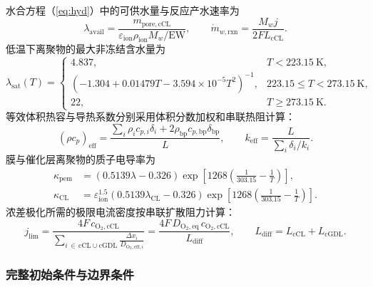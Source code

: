 \documentclass{gmcmthesis}
\begin{document}
水合方程（\ref{eq:hyd}）中的可供水量与反应产水速率为
\begin{equation}
  \lambda_{\mathrm{avail}}
  =\frac{m_{\mathrm{pore,cCL}}}{\varepsilon_{\mathrm{ion}}\rho_{\mathrm{ion}}M_w/\mathrm{EW}},
  \qquad
  \dot m_{w,\mathrm{rxn}}=\frac{M_wj}{2FL_{\mathrm{cCL}}}.
  \label{eq:hydclosure}
\end{equation}
低温下离聚物的最大非冻结含水量为
\begin{equation}
  \lambda_{\mathrm{sat}}(T)=
  \begin{cases}
    4.837, & T<223.15~\mathrm{K},\\[0.5ex]
    \left(-1.304+0.01479T-3.594\times10^{-5}T^2\right)^{-1}, & 223.15\le T<273.15~\mathrm{K},\\[0.5ex]
    22, & T\ge273.15~\mathrm{K}.
  \end{cases}
  \label{eq:lambdasat}
\end{equation}
等效体积热容与导热系数分别采用体积分数加权和串联热阻计算：
\begin{equation}
  (\rho c_p)_{\mathrm{eff}}
  =\frac{\sum_i\rho_i c_{p,i}\delta_i+2\rho_{\mathrm{bp}}c_{p,\mathrm{bp}}\delta_{\mathrm{bp}}}{L},
  \qquad
  k_{\mathrm{eff}}=\frac{L}{\sum_i\delta_i/k_i}.
  \label{eq:thermalprop}
\end{equation}
膜与催化层离聚物的质子电导率为
\begin{equation}
  \begin{aligned}
    \kappa_{\mathrm{pem}}
    &=(0.5139\lambda-0.326)\exp\!\left[1268\!\left(\frac{1}{303.15}-\frac{1}{T}\right)\right],\\
    \kappa_{\mathrm{CL}}
    &=\varepsilon_{\mathrm{ion}}^{1.5}(0.5139\lambda_{\mathrm{CL}}-0.326)
      \exp\!\left[1268\!\left(\frac{1}{303.15}-\frac{1}{T}\right)\right].
  \end{aligned}
  \label{eq:kappa}
\end{equation}
浓差极化所需的极限电流密度按串联扩散阻力计算：
\begin{equation}
  j_{\mathrm{lim}}=\frac{4F\,c_{\mathrm{O_2,cCL}}}{\displaystyle\sum_{i\,\in\,\mathrm{cCL}\cup\mathrm{cGDL}}\frac{\Delta x_i}{D_{\mathrm{O_2,eff},i}}}
  =\frac{4F\,D_{\mathrm{O_2,eq}}\,c_{\mathrm{O_2,cCL}}}{L_{\mathrm{diff}}},
  \qquad
  L_{\mathrm{diff}}=L_{\mathrm{cCL}}+L_{\mathrm{cGDL}}.
  \label{eq:jlim}
\end{equation}

\subsubsection{完整初始条件与边界条件}
\end{document}
